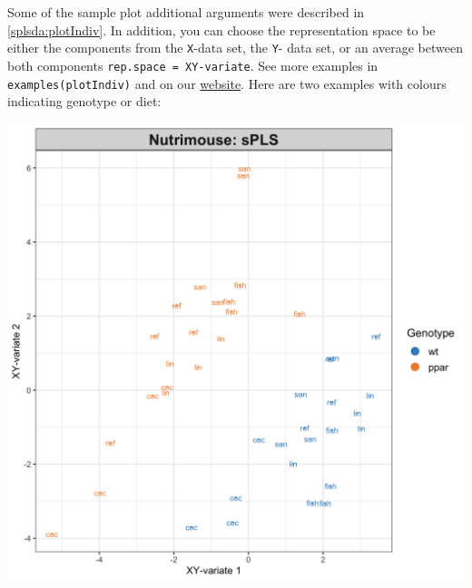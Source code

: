 \documentclass[]{book}
\newenvironment{Shaded}{\begin{snugshade}}{\end{snugshade}}
\newcommand{\DataTypeTok}[1]{\textcolor[rgb]{0.13,0.29,0.53}{#1}}
\newcommand{\KeywordTok}[1]{\textcolor[rgb]{0.13,0.29,0.53}{\textbf{#1}}}
\newcommand{\NormalTok}[1]{#1}
\newcommand{\OperatorTok}[1]{\textcolor[rgb]{0.81,0.36,0.00}{\textbf{#1}}}
\newcommand{\OtherTok}[1]{\textcolor[rgb]{0.56,0.35,0.01}{#1}}
\newcommand{\StringTok}[1]{\textcolor[rgb]{0.31,0.60,0.02}{#1}}
\begin{document}
Some of the sample plot additional arguments were described in \ref{splsda:plotIndiv}. In addition, you can choose the representation space to be either the components from the \texttt{X}-data set, the \texttt{Y}- data set, or an average between both components \texttt{rep.space\ =\ \textquotesingle{}XY-variate\textquotesingle{}}. See more examples in \texttt{examples(plotIndiv)} and on our \href{http://mixomics.org/graphics/sample-plots/}{website}. Here are two examples with colours indicating genotype or diet:

\begin{Shaded}
\end{Shaded}

\begin{center}\includegraphics[width=0.75\linewidth,]{Figures/05-pls-plotIndiv-1-1} \end{center}

\begin{Shaded}
\end{Shaded}
\end{document}
